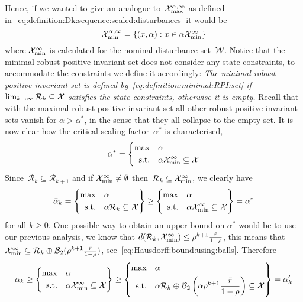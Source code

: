 %
Hence, if we wanted to give an analogue to~$\mathcal X^{\alpha,\infty}_{\max}$ as defined in~\eqref{eq:definition:Dk:sequence:scaled:disturbances} it would be
%
\begin{equation}
	\mathcal X^{\alpha,\infty}_{\min} = \{(x,\alpha):x\in\alpha\mathcal X^\infty_{\min}\}
\end{equation}
%
where $\mathcal X^\infty_{\min}$ is calculated for the nominal disturbance set~$\mathcal W$.
%
Notice that the minimal robust positive invariant set does not consider any state constraints, to accommodate the constraints we define it accordingly:
%
\textit{The minimal robust positive invariant set is defined by~\eqref{eq:definition:minimal:RPI:set} if $\lim_{k\rightarrow\infty}\mathcal R_k\subseteq\mathcal X$ satisfies the state constraints, otherwise it is empty.}
%
Recall that with the maximal robust positive invariant set all other robust positive invariant sets vanish for $\alpha>\alpha^\ast$, in the sense that they all collapse to the empty set.
%
It is now clear how the critical scaling factor~$\alpha^\ast$ is characterised,
%
\begin{equation}\label{eq:alpha:ast:ideal:scenario}
	\alpha^\ast = \left\{\begin{aligned}\max&\quad \alpha\\
	\text{s.t.}&\quad \alpha\mathcal X^{\infty}_{\min}\subseteq\mathcal X
\end{aligned}\right.
\end{equation}
%
Since~$\mathcal R_k\subseteq\mathcal R_{k+1}$ and if $\mathcal X_{\min}^\infty\neq\emptyset$ then~$\mathcal R_k\subseteq\mathcal X^\infty_{\min}$, we clearly have
%
\begin{equation}
	\bar\alpha_k = \left\{\begin{aligned}\max&\quad\alpha\\ \text{s.t.}&\quad \alpha\mathcal R_k\subseteq\mathcal X\end{aligned}\right\}\geq\left\{\begin{aligned}\max&\quad\alpha\\\text{s.t.}&\quad\alpha\mathcal X^\infty_{\min}\subseteq\mathcal X\end{aligned}\right\}=\alpha^\ast
\end{equation}
%
for all $k\geq0$.
%
One possible way to obtain an upper bound on $\alpha^\ast$ would be to use our previous analysis, we know that $d(\mathcal R_k,\mathcal X^\infty_{\min})\leq \rho^{k+1}\frac{\bar r}{1-\rho}$, this means that $\mathcal X^\infty_{\min}\subseteq\mathcal R_k\oplus\mathcal B_2(\rho^{k+1}\frac{\bar r}{1-\rho})$, see~\eqref{eq:Hausdorff:bound:using:balls}.
%
Therefore
%
\begin{equation}\label{eq:possible:way:to:compute:alpha:ast}
	\bar\alpha_k\geq\left\{\begin{aligned}\max&\quad\alpha\\\text{s.t.}&\quad\alpha\mathcal X^\infty_{\min}\subseteq\mathcal X\end{aligned}\right\}\geq \left\{\begin{aligned}\max&\quad\alpha\\\text{s.t.}&\quad \alpha\mathcal R_k\oplus\mathcal B_2\left(\alpha\rho^{k+1}\frac{\bar r}{1-\rho}\right)\subseteq\mathcal X\end{aligned}\right\}=\alpha^\prime_k
\end{equation}
